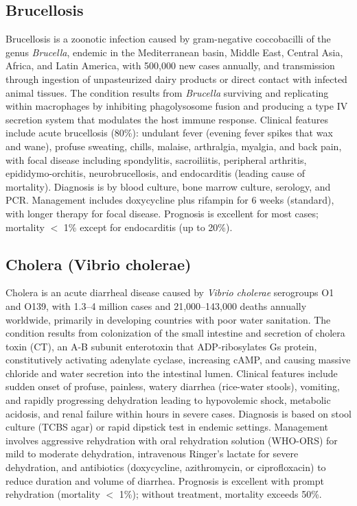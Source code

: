 \subsection{Brucellosis}
\label{sec:Brucellosis}
Brucellosis is a zoonotic infection caused by gram-negative coccobacilli of the genus \textit{Brucella}, endemic in the Mediterranean basin, Middle East, Central Asia, Africa, and Latin America, with 500,000 new cases annually, and transmission through ingestion of unpasteurized dairy products or direct contact with infected animal tissues. The condition results from \textit{Brucella} surviving and replicating within macrophages by inhibiting phagolysosome fusion and producing a type IV secretion system that modulates the host immune response. Clinical features include acute brucellosis (80\%): undulant fever (evening fever spikes that wax and wane), profuse sweating, chills, malaise, arthralgia, myalgia, and back pain, with focal disease including spondylitis, sacroiliitis, peripheral arthritis, epididymo-orchitis, neurobrucellosis, and endocarditis (leading cause of mortality). Diagnosis is by blood culture, bone marrow culture, serology, and PCR. Management includes doxycycline plus rifampin for 6 weeks (standard), with longer therapy for focal disease. Prognosis is excellent for most cases; mortality $<$ 1\% except for endocarditis (up to 20\%).

\subsection{Cholera (Vibrio cholerae)}
\label{sec:Cholera}
Cholera is an acute diarrheal disease caused by \textit{Vibrio cholerae} serogroups O1 and O139, with 1.3--4 million cases and 21,000--143,000 deaths annually worldwide, primarily in developing countries with poor water sanitation. The condition results from colonization of the small intestine and secretion of cholera toxin (CT), an A-B subunit enterotoxin that ADP-ribosylates Gs protein, constitutively activating adenylate cyclase, increasing cAMP, and causing massive chloride and water secretion into the intestinal lumen. Clinical features include sudden onset of profuse, painless, watery diarrhea (rice-water stools), vomiting, and rapidly progressing dehydration leading to hypovolemic shock, metabolic acidosis, and renal failure within hours in severe cases. Diagnosis is based on stool culture (TCBS agar) or rapid dipstick test in endemic settings. Management involves aggressive rehydration with oral rehydration solution (WHO-ORS) for mild to moderate dehydration, intravenous Ringer's lactate for severe dehydration, and antibiotics (doxycycline, azithromycin, or ciprofloxacin) to reduce duration and volume of diarrhea. Prognosis is excellent with prompt rehydration (mortality $<$ 1\%); without treatment, mortality exceeds 50\%.

